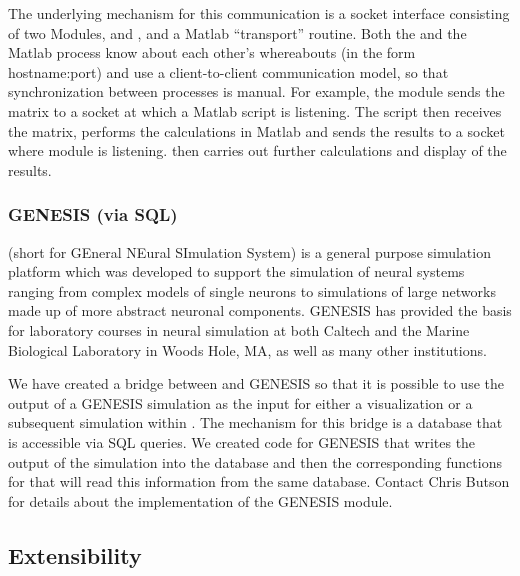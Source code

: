 The underlying mechanism for this communication is a socket interface
consisting of two \SR{} Modules,  and
, and a Matlab ``transport'' routine.  Both the \SR{}
and the Matlab process know about each other's whereabouts (in the form
hostname:port) and use a client-to-client communication model, so that
synchronization between processes is manual.  For example, 
the \SR{}  module sends the matrix to a socket at which a 
Matlab script is listening.  The script then receives the matrix, 
performs the calculations in Matlab and sends the results to a socket 
where  module is listening.  \SR then carries out
further calculations and display of the results.


\subsubsection{GENESIS (via SQL)}

(short for GEneral NEural SImulation System) is a general purpose
simulation platform which was developed to support the simulation of neural
systems ranging from complex models of single neurons to simulations of
large networks made up of more abstract neuronal components. GENESIS has
provided the basis for laboratory courses in neural simulation at both
Caltech and the Marine Biological Laboratory in Woods Hole, MA, as well as
many other institutions.   

We have created a bridge between \SR{} and GENESIS so that it is possible
to use the output of a GENESIS simulation as the input for either a
visualization or a subsequent simulation within \BIOPSE{}.  The mechanism for
this bridge is a database that is accessible via SQL queries.  We created
code for GENESIS that writes the output of the simulation into the database
and then the corresponding functions for \SR{} that will read this
information from the same database.   Contact Chris Butson
for details about the implementation of the GENESIS module.

\subsection{Extensibility}
\label{sec:con-extend} 

